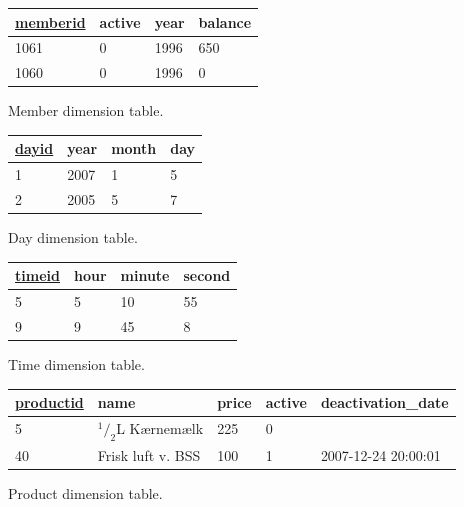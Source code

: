 \begin{figure}[H]
    \centering
    \begin{tabular}{|l|l|l|l|}
        \hline
        \underline{memberid}        & active    & year & balance    \\ \hline
        1061                        & 0         & 1996 & 650        \\ \hline
        1060                        & 0         & 1996 & 0          \\ \hline
    \end{tabular}
    \caption{Member dimension table.}
    \label{fig:member_scheme}
\vspace{0.5cm}
    \begin{tabular}{|l|l|l|l|}
        \hline
        \underline{dayid}       & year      & month & day   \\ \hline
        1                       & 2007      & 1     & 5     \\ \hline
        2                       & 2005      & 5     & 7     \\ \hline
    \end{tabular}
    \caption{Day dimension table.}
    \label{fig:day_scheme}
\vspace{0.5cm}
    \begin{tabular}{|l|l|l|l|}
        \hline
        \underline{timeid}      & hour      & minute    & second    \\ \hline
        5                       & 5         & 10        & 55        \\ \hline
        9                       & 9         & 45        & 8         \\ \hline
    \end{tabular}
    \caption{Time dimension table.}
    \label{fig:time_scheme}
\vspace{0.5cm}
    \begin{tabular}{|l|l|l|l|l|}
        \hline
        \underline{productid}   & name                  & price     & active    & deactivation\_date    \\ \hline
        5                       & $^1/_2$L Kærnemælk    & 225       & 0         &                       \\ \hline
        40                      & Frisk luft v. BSS     & 100       & 1         & 2007-12-24 20:00:01   \\ \hline
    \end{tabular}
    \caption{Product dimension table.}
    \label{fig:product_scheme}
\vspace{0.5cm}

\end{figure}
